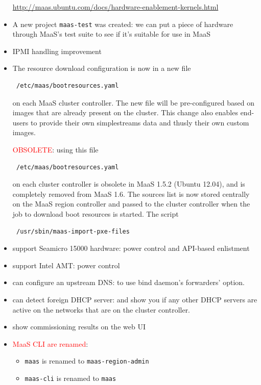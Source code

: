 \begin{itemize}
  \url{http://maas.ubuntu.com/docs/hardware-enablement-kernels.html}
  
  \item A new project \verb!maas-test! was created: we can put a piece of
  hardware through MaaS's test suite to see if it's suitable for use in MaaS
  
  \item IPMI handling improvement
  
  \item The resource download configuration is now in a new file
 \begin{verbatim}
 /etc/maas/bootresources.yaml
 \end{verbatim}
 on each MaaS cluster controller. The new file will be pre-configured based on
 images that are already present on the cluster. This change also enables end-users to provide their own simplestreams data and
 thusly their own custom images.
 
 \textcolor{red}{OBSOLETE}: using this file 
 \begin{verbatim}
 /etc/maas/bootresources.yaml
 \end{verbatim}
 on each cluster controller is obsolete in MaaS 1.5.2 (Ubuntu 12.04), and is completely removed from MaaS
 1.6.  The sources list is now stored centrally on the MaaS region controller
 and passed to the cluster controller when the job to download boot resources is started. The
 script
 \begin{verbatim}
 /usr/sbin/maas-import-pxe-files
 \end{verbatim}
 
   \item support Seamicro 15000 hardware: power control and API-based enlistment
   
   \item support Intel AMT: power control
   
   \item can configure an upstream DNS: to use bind daemon's forwarders' option.
   
   \item can detect foreign DHCP server: and show you if any other DHCP servers
   are active on the networks that are on the cluster controller.
   
   \item show commissioning results on the web UI
   
   \item \textcolor{red}{MaaS CLI are renamed}: 
   \begin{itemize}
     \item \verb!maas! is renamed to \verb!maas-region-admin!
     \item \verb!maas-cli! is renamed to \verb!maas!
   \end{itemize}
 
\end{itemize}


